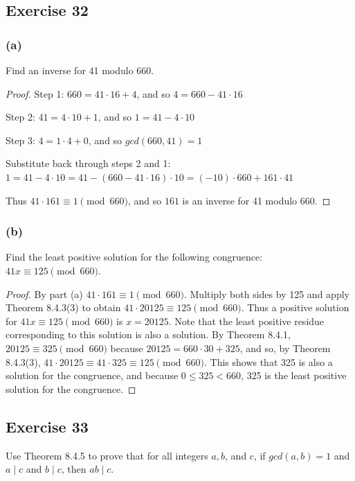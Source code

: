 \documentclass[14pt]{extarticle}
\newcommand{\cy}{\color{cyan}}
\begin{document}
\subsection{Exercise 32}
\subsubsection{(a)}
Find an inverse for 41 modulo 660.

\begin{proof}
{\cy Step 1:} \(660 = 41 \cdot 16 + 4\), and so \(4 = 660 - 41 \cdot 16\)

{\cy Step 2:} \(41 = 4 \cdot 10 + 1\), and so \(1 = 41 - 4 \cdot 10\)

{\cy Step 3:} \(4 = 1 \cdot 4 + 0\), and so \(gcd(660, 41) = 1\)

Substitute back through steps 2 and 1: 
\(1 = 41 - 4 \cdot 10 = 41 - (660 - 41 \cdot 16) \cdot 10 = (-10) \cdot 660 + 161 \cdot 41\)

Thus \(41 \cdot 161 \equiv 1 \pmod{660}\), and so \(161\) is an inverse for 41 modulo 660.
\end{proof}

\subsubsection{(b)}
Find the least positive solution for the following congruence: \(41x \equiv 125 \pmod{660}\).

\begin{proof}
By part (a) \(41 \cdot 161 \equiv 1 \pmod{660}\). Multiply both sides by 125 and apply Theorem 8.4.3(3) to obtain 
\(41 \cdot 20125 \equiv 125 \pmod{660}\). Thus a positive solution for \(41x \equiv 125 \pmod{660}\) is 
\(x = 20125\). Note that the least positive residue corresponding to this solution is also a solution. By 
Theorem 8.4.1, \(20125 \equiv 325 \pmod{660}\) because \(20125 = 660 \cdot 30 + 325\), and so, by Theorem 
8.4.3(3), \(41 \cdot 20125 \equiv 41 \cdot 325 \equiv 125 \pmod{660}\). This shows that 325 is also a solution for 
the congruence, and because \(0 \leq 325 < 660\), 325 is the least positive solution for the congruence.
\end{proof}

\subsection{Exercise 33}
Use Theorem 8.4.5 to prove that for all integers \(a, b\), and $c$, if \(gcd(a, b) = 1\) and \(a \mid c\) and \(b \mid 
c\), then \(ab \mid c\).
\end{document}
